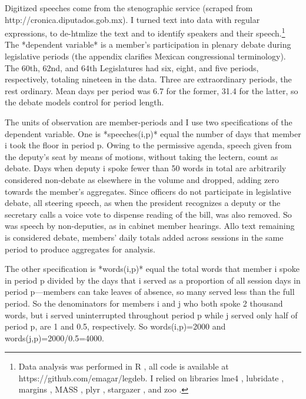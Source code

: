 \documentclass[letter,12pt]{article}
\begin{document}



Digitized speeches come from the stenographic service (scraped from http://cronica.diputados.gob.mx). I turned text into data with regular expressions, to de-htmlize the text and to identify speakers and their speech.\footnote{Data analysis was performed in R \citep{r.cite}, all code is available at https://github.com/emagar/legdeb. I relied on libraries lme4 \citep{r.lme4}, lubridate \citep{r.lubridate}, margins \citep{r.margins}, MASS \citep{r.mass}, plyr \citep{r.plyr}, stargazer \citep{r.stargazer}, and zoo \citep{r.zoo}.} The *dependent variable* is a member's participation in plenary debate during legislative periods (the appendix clarifies Mexican congressional terminology). The 60th, 62nd, and 64th Legislatures had six, eight, and five periods, respectively, totaling nineteen in the data. Three are extraordinary periods, the rest ordinary. Mean days per period was 6.7 for the former, 31.4 for the latter, so the debate models control for period length. 

The units of observation are member-periods and I use two specifications of the dependent variable. One is *speeches(i,p)* equal the number of days that member i took the floor in period p. Owing to the permissive agenda, speech given from the deputy's seat by means of motions, without taking the lectern, count as debate. Days when deputy i spoke fewer than 50 words in total are arbitrarily considered non-debate as elsewhere in the volume and dropped, adding zero towards the member's aggregates. Since officers do not participate in legislative debate, all steering speech, as when the president recognizes a deputy or the secretary calls a voice vote to dispense reading of the bill, was also removed. So was speech by non-deputies, as in cabinet member hearings. Allo text remaining is considered debate, members' daily totals added across sessions in the same period to produce aggregates for analysis. 

The other specification is *words(i,p)* equal the total words that member i spoke in period p divided by the days that i served as a proportion of all session days in period p---members can take leaves of absence, so many served less than the full period. So the denominators for members i and j who both spoke 2 thousand words, but i served uninterrupted throughout period p while j served only half of period p, are 1 and 0.5, respectively. So words(i,p)=2000 and words(j,p)=2000/0.5=4000. 
\end{document}
